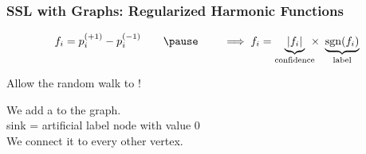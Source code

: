\documentclass{beamer}
\newcommand{\misoclasstinytitleslide}{Partially based on material by:   Gary Miller, \\ Mikhail Belkin, Branislav Kveton, \\[-1em] Doyle \& Schnell, Daniel Spielman}
\begin{document}
\newcommand{\topictitle}{SSL Regularization and Stability}
\newcommand{\topicsubtitle}{Regularized, Soft Harmonic, and Stability Bounds}
\renewcommand{\misoclasstinytitleslide}{Partially based on material by:  Mikhail Belkin, Partha Niyogi, \\[-1em] Olivier Chapelle, Bernhard Sch\"olkopf}

\MakeTopicSlide

\begin{frame}
\frametitle{SSL with Graphs: Regularized Harmonic Functions}

\[
f_i =  p_i^{(+1)} - p_i^{(-1)} \qquad \pause \qquad \implies f_i = \underbrace{|f_i|}_{\rm confidence}\!\!\!\times\ \underbrace{\sgn(f_i)}_{\rm label}
\]

\pause
{}
\pause
{}
\pause
{}
\pause
\begin{center}
Allow the random walk to !
\end{center}
\pause
We add a  to the graph. \\[0.5em]
\pause
sink = artificial label node with value 0 \\[0.5em]
\pause
We connect it to every other vertex. \\[0.5em]
\pause

\begin{flushright}
 \\
\pause
{}
\end{flushright}
\end{frame}
\end{document}
